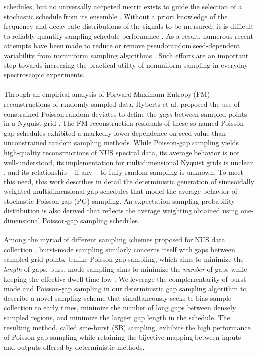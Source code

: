 \begin{doublespace}
schedules, but no universally accpeted metric exists to guide the selection
of a stochastic schedule from its ensemble \cite{mobli:jmr2015,aoto:jmr2014}.
Without a priori knowledge of the frequency and decay rate distributions of
the signals to be measured, it is difficult to reliably quantify sampling
schedule performance \cite{mobli:pnmrs2014,schuyler:jbnmr2011}. As a result,
numerous recent attempts have been made to reduce or remove pseudorandom
seed-dependent variability from nonuniform sampling algorithms
\cite{kazimierczuk:jmr2007,hyberts:jacs2010,eddy:jmr2012,mobli:jmr2015}.
Such efforts are an important step towards increasing the practical utility
of nonuniform sampling in everyday spectroscopic experiments.
\\\\
Through an empirical analysis of Forward Maximum Entropy (FM) reconstructions
of randomly sampled data, Hyberts et al. proposed the use of constrained
Poisson random deviates to define the \emph{gaps} between sampled points
in a Nyquist grid \cite{hyberts:jacs2010}. The FM reconstruction residuals
of these so-named Poisson-gap schedules exhibited a markedly lower dependence
on seed value than unconstrained random sampling methods. While Poisson-gap
sampling yields high-quality reconstructions of NUS spectral data, its average
behavior is not well-understood, its implementation for multidimensional
Nyquist grids is unclear
\cite{hyberts:tcc2012,hyberts:jbnmr2012,hyberts:jmr2014},
and its relationship -- if any -- to fully random sampling is unknown.
To meet this need, this work describes in detail the deterministic generation
of sinusoidally weighted multidimensional gap schedules that model the average
behavior of stochastic Poisson-gap (PG) sampling. An expectation sampling
probability distribution is also derived that reflects the average weighting
obtained using one-dimensional Poisson-gap sampling schedules.
\\\\
Among the myriad of different sampling schemes proposed for NUS data
collection \cite{maciejewski:tcc2012}, burst-mode sampling similarly concerns
itself with gaps between sampled grid points. Unlike Poisson-gap sampling,
which aims to minimize the \emph{length} of gaps, burst-mode sampling aims
to minimize the \emph{number} of gaps while keeping the effective dwell time
low \cite{maciejewski:jmr2009}. We leverage the complementarity of burst-mode
and Poisson-gap sampling in our deterministic gap sampling algorithm to
describe a novel sampling scheme that simultaneously seeks to bias sample
collection to early times, minimize the number of long gaps between densely
sampled regions, and minimize the largest gap length in the schedule. The
resulting method, called sine-burst (SB) sampling, exhibits the high
performance of Poisson-gap sampling while retaining the bijective mapping
between inputs and outputs offered by deterministic methods.
\end{doublespace}

